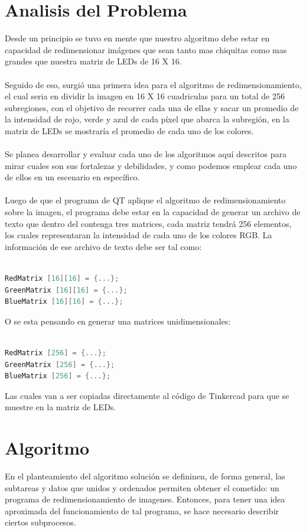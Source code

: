 \documentclass{article}
\begin{document}
\section{Analisis del Problema} \label{Analisis}
Desde un principio se tuvo en mente que nuestro algoritmo debe estar en capacidad de redimensionar imágenes que sean tanto mas chiquitas como mas grandes que nuestra matriz de LEDs de 16 X 16.
\\
\\
Seguido de eso, surgió una primera idea para el algoritmo de redimensionamiento, el cual seria en dividir la imagen en 16 X 16 cuadriculas para un total de 256 subregiones, con el objetivo de recorrer cada una de ellas y sacar un promedio de la intensidad de rojo, verde y azul de cada píxel que abarca la subregión, en la matriz de LEDs se mostraría el promedio de cada uno de los colores.
\\
\\
Se planea desarrollar y evaluar cada uno de los algoritmos aquí descritos para mirar cuales son sus fortalezas y debilidades, y como podemos emplear cada uno de ellos en un escenario en específico.
\\
\\
Luego de que el programa de QT aplique el algoritmo de redimensionamiento sobre la imagen, el programa debe estar en la capacidad de generar un archivo de texto que dentro del contenga tres matrices, cada matriz tendrá 256 elementos, los cuales representaran la intensidad de cada uno de los colores RGB. La información de ese archivo de texto debe ser tal como:
\\
\\
\begin{lstlisting}[language=C++, label=codigo_ejemplo]
RedMatrix [16][16] = {...};
GreenMatrix [16][16] = {...};
BlueMatrix [16][16] = {...};
\end{lstlisting}
O se esta pensando en generar una matrices unidimensionales:
\\
\\
\begin{lstlisting}[language=C++, label=codigo_ejemplo2]
RedMatrix [256] = {...};
GreenMatrix [256] = {...};
BlueMatrix [256] = {...};
\end{lstlisting}
Las cuales van a ser copiadas directamente al código de Tinkercad para que se muestre en la matriz de LEDs.

\section{Algoritmo} \label{algoritmo}
En el planteamiento del algoritmo solución se defininen, de forma general, las subtareas y datos que unidos y ordenados permiten obtener el cometido: un programa de redimensionamiento de imagenes. Entonces, para tener una idea aproximada del funcionamiento de tal programa, se hace necesario describir ciertos subprocesos. 
\end{document}
